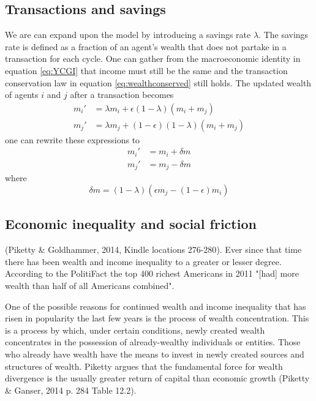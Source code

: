 \documentclass[10pt, a4paper]{amsart}
\begin{document}
\subsection{Transactions and savings}
We are can expand upon the model by introducing a savings rate $\lambda$. The savings rate is defined as a fraction of an agent's wealth that does not partake in a transaction for each cycle. One can gather from the macroeconomic identity in equation \ref{eq:YCGI} that income must still be the same and the transaction conservation law in equation \ref{eq:wealthconserved} still holds. The updated wealth of agents $i$ and $j$ after a transaction becomes
\begin{align}
m_i' &= \lambda m_i + \epsilon (1 - \lambda) (m_i + m_j) \\
m_j' &= \lambda m_j + (1- \epsilon) (1 - \lambda) (m_i + m_j)
\end{align}
one can rewrite these expressions to
\begin{align*}
m_i' &= m_i + \delta m \\
m_j' &= m_j - \delta m
\end{align*}
where
\begin{equation}
\delta m = (1 - \lambda)(\epsilon m_j - (1 - \epsilon)m_i)
\end{equation}

\subsection{Economic inequality and social friction}
 (Piketty \& Goldhammer, 2014, Kindle locations 276-280\cite{Piketty}). Ever since that time there has been wealth and income inequality to a greater or lesser degree. According to the PolitiFact the top 400 richest Americans in 2011 "[had] more wealth than half of all Americans combined"\cite{Moore}.

One of the possible reasons for continued wealth and income inequality that has risen in popularity the last few years is the process of wealth concentration. This is a process by which, under certain conditions, newly created wealth concentrates in the possession of already-wealthy individuals or entities. Those who already have wealth have the means to invest in newly created sources and structures of wealth. Piketty argues that the fundamental force for wealth divergence is the usually greater return of capital than economic growth (Piketty \& Ganser, 2014 p. 284 Table 12.2\cite{Piketty}).
\end{document}
